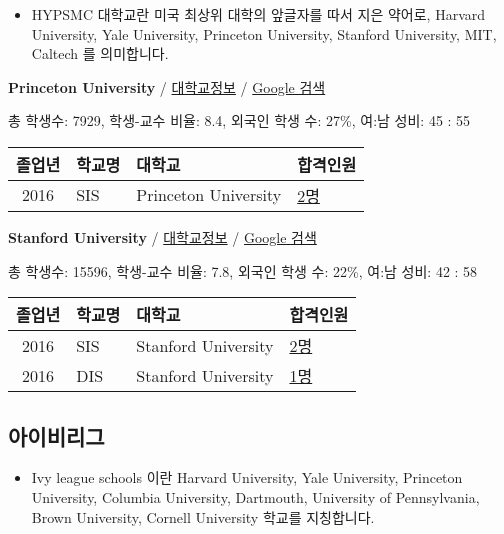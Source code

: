 \documentclass[13pt,]{article}
\providecommand{\tightlist}{%
  \setlength{\itemsep}{0pt}\setlength{\parskip}{0pt}}
\begin{document}
\begin{itemize}
\tightlist
\item
  HYPSMC 대학교란 미국 최상위 대학의 앞글자를 따서 지은 약어로, Harvard
  University, Yale University, Princeton University, Stanford
  University, MIT, Caltech 를 의미합니다.
\end{itemize}

\textbf{Princeton University} /
\href{https://www.timeshighereducation.com/world-university-rankings/princeton-university?ranking-dataset=133819}{대학교정보}
/ \href{http://www.google.com/search?q=Princeton+University}{Google
검색}

총 학생수: 7929, 학생-교수 비율: 8.4, 외국인 학생 수: 27\%, 여:남 성비:
45 : 55

\begin{longtable}[]{@{}clll@{}}
\toprule
졸업년 & 학교명 & 대학교 & 합격인원\tabularnewline
\midrule
\endhead
2016 & SIS & Princeton University &
\href{http://cafe.naver.com/assarabia/11589}{2명}\tabularnewline
\bottomrule
\end{longtable}

\textbf{Stanford University} /
\href{https://www.timeshighereducation.com/world-university-rankings/stanford-university?ranking-dataset=133819}{대학교정보}
/ \href{http://www.google.com/search?q=Stanford+University}{Google 검색}

총 학생수: 15596, 학생-교수 비율: 7.8, 외국인 학생 수: 22\%, 여:남 성비:
42 : 58

\begin{longtable}[]{@{}clll@{}}
\toprule
졸업년 & 학교명 & 대학교 & 합격인원\tabularnewline
\midrule
\endhead
2016 & SIS & Stanford University &
\href{http://cafe.naver.com/assarabia/11589}{2명}\tabularnewline
2016 & DIS & Stanford University &
\href{http://cafe.naver.com/assarabia/11591}{1명}\tabularnewline
\bottomrule
\end{longtable}

\subsection{아이비리그}

\begin{itemize}
\tightlist
\item
  Ivy league schools 이란 Harvard University, Yale University, Princeton
  University, Columbia University, Dartmouth, University of
  Pennsylvania, Brown University, Cornell University 학교를 지칭합니다.
\end{itemize}
\end{document}
